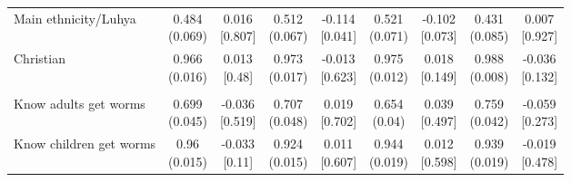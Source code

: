 {\begin{tabular}[t]{lcccccccc}
\hspace{1em}Main ethnicity/Luhya & \makecell[c]{0.484\\(0.069)} & \makecell[c]{0.016\\{[0.807]}} & \makecell[c]{0.512\\(0.067)} & \makecell[c]{-0.114\\{[0.041]}} & \makecell[c]{0.521\\(0.071)} & \makecell[c]{-0.102\\{[0.073]}} & \makecell[c]{0.431\\(0.085)} & \makecell[c]{0.007\\{[0.927]}}\\
\hspace{1em}Christian & \makecell[c]{0.966\\(0.016)} & \makecell[c]{0.013\\{[0.48]}} & \makecell[c]{0.973\\(0.017)} & \makecell[c]{-0.013\\{[0.623]}} & \makecell[c]{0.975\\(0.012)} & \makecell[c]{0.018\\{[0.149]}} & \makecell[c]{0.988\\(0.008)} & \makecell[c]{-0.036\\{[0.132]}}\\
\addlinespace[0.3em]
\hline
\multicolumn{9}{l}{\textit{\textbf{Panel C: Deworming knowledge, $N=1,995$}}}\\
\hline
\hspace{1em}Know adults get worms & \makecell[c]{0.699\\(0.045)} & \makecell[c]{-0.036\\{[0.519]}} & \makecell[c]{0.707\\(0.048)} & \makecell[c]{0.019\\{[0.702]}} & \makecell[c]{0.654\\(0.04)} & \makecell[c]{0.039\\{[0.497]}} & \makecell[c]{0.759\\(0.042)} & \makecell[c]{-0.059\\{[0.273]}}\\
\hspace{1em}Know children get worms & \makecell[c]{0.96\\(0.015)} & \makecell[c]{-0.033\\{[0.11]}} & \makecell[c]{0.924\\(0.015)} & \makecell[c]{0.011\\{[0.607]}} & \makecell[c]{0.944\\(0.019)} & \makecell[c]{0.012\\{[0.598]}} & \makecell[c]{0.939\\(0.019)} & \makecell[c]{-0.019\\{[0.478]}}\\

\end{tabular}}
